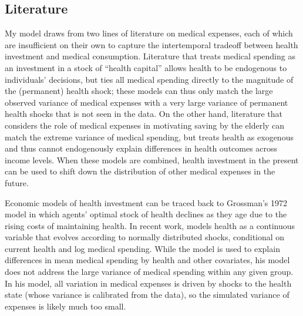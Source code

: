 \documentclass[12pt,pdftex,letterpaper]{article}
\begin{document}
\subsection{Literature}
\label{sec:Lit}

My model draws from two lines of literature on medical expenses, each of which are insufficient on their own to capture the intertemporal tradeoff between health investment and medical consumption.  Literature that treats medical spending as an investment in a stock of ``health capital'' allows health to be endogenous to individuals' decisions, but ties all medical spending directly to the magnitude of the (permanent) health shock; these models can thus only match the large observed variance of medical expenses with a very large variance of permanent health shocks that is not seen in the data.  On the other hand, literature that considers the role of medical expenses in motivating saving by the elderly can match the extreme variance of medical spending, but treats health as exogenous and thus cannot endogenously explain differences in health outcomes across income levels.  When these models are combined, health investment in the present can be used to shift down the distribution of other medical expenses in the future.

Economic models of health investment can be traced back to Grossman's 1972 model in which agents' optimal stock of health declines as they age due to the rising costs of maintaining health.  In recent work, \cite{yogo09} models health as a continuous variable that evolves according to normally distributed shocks, conditional on current health and log medical spending.  While the model is used to explain differences in mean medical spending by health and other covariates, his model does not address the large variance of medical spending within any given group.  In his model, all variation in medical expenses is driven by shocks to the health state (whose variance is calibrated from the data), so the simulated variance of expenses is likely much too small.
\end{document}
